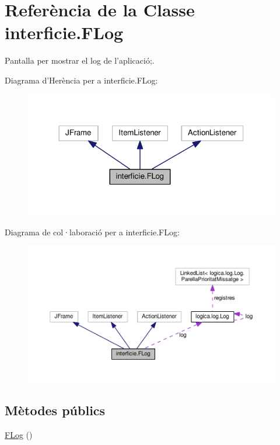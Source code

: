 \hypertarget{classinterficie_1_1_f_log}{\section{Referència de la Classe interficie.\+F\+Log}
\label{classinterficie_1_1_f_log}
}


Pantalla per mostrar el log de l'aplicació;.  




Diagrama d'Herència per a interficie.\+F\+Log\+:
\nopagebreak
\begin{figure}[H]
\begin{center}
\leavevmode
\includegraphics[width=317pt]{classinterficie_1_1_f_log__inherit__graph}
\end{center}
\end{figure}


Diagrama de col·laboració per a interficie.\+F\+Log\+:
\nopagebreak
\begin{figure}[H]
\begin{center}
\leavevmode
\includegraphics[width=350pt]{classinterficie_1_1_f_log__coll__graph}
\end{center}
\end{figure}
\subsection*{Mètodes públics}
\begin{DoxyCompactItemize}
\item 
\hyperlink{classinterficie_1_1_f_log_ae5adf477dd1e9a2711f855e7505902b2}{F\+Log} ()
\end{DoxyCompactItemize}

